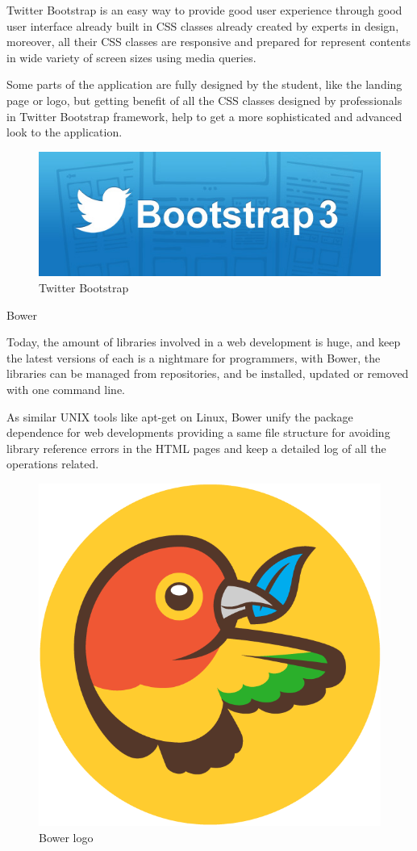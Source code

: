 \documentclass{DeustoFDP}
\begin{document}
Twitter Bootstrap \cite{Twitterbootstrap} is an easy way to provide good user experience through good user interface already built in CSS classes already created by experts in design, moreover, all their CSS classes are responsive and prepared for represent contents in wide variety of screen sizes using media queries.

Some parts of the application are fully designed by the student, like the landing page or logo, but getting benefit of all the CSS classes designed by professionals in Twitter Bootstrap framework, help to get a more sophisticated and advanced look to the application.

\begin{figure}[h]
\centering
\includegraphics[width=0.7\linewidth]{fig/bootstrap-3}
\caption[Twitter Bootstrap]{Twitter Bootstrap}
\label{fig:bootstrap-3}
\end{figure}


{\large Bower}

Today, the amount of libraries involved in a web development is huge, and keep the latest versions of each is a nightmare for programmers, with Bower, the libraries can be managed from repositories, and be installed, updated or removed with one command line.

As similar UNIX tools like apt-get on Linux, Bower unify the package dependence for web developments providing a same file structure for avoiding library reference errors in the HTML pages and keep a detailed log of all the operations related.

\begin{figure}[h]
\centering
\includegraphics[width=0.3\linewidth]{fig/Bower}
\caption[Bower logo]{Bower logo}
\label{fig:Bower}
\end{figure}
\end{document}
